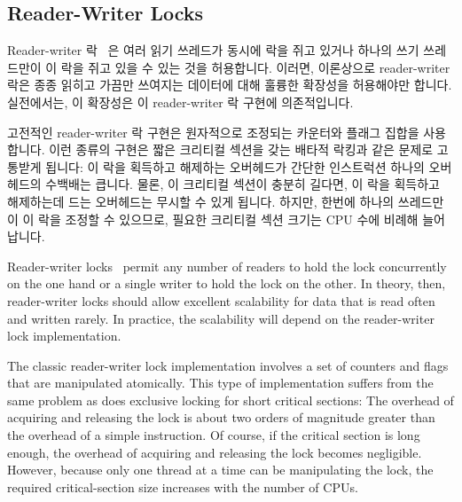 \subsection{Reader-Writer Locks}
\label{sec:locking:Reader-Writer Locks}

Reader-writer 락~\cite{Courtois71} 은 여러 읽기 쓰레드가 동시에 락을 쥐고
있거나 하나의 쓰기 쓰레드만이 이 락을 쥐고 있을 수 있는 것을 허용합니다.
이러면, 이론상으로 reader-writer 락은 종종 읽히고 가끔만 쓰여지는 데이터에 대해
훌륭한 확장성을 허용해야만 합니다.
실전에서는, 이 확장성은 이 reader-writer 락 구현에 의존적입니다.

고전적인 reader-writer 락 구현은 원자적으로 조정되는 카운터와 플래그 집합을
사용합니다.
이런 종류의 구현은 짧은 크리티컬 섹션을 갖는 배타적 락킹과 같은 문제로 고통받게
됩니다: 이 락을 획득하고 해제하는 오버헤드가 간단한 인스트럭션 하나의
오버헤드의 수백배는 큽니다.
물론, 이 크리티컬 섹션이 충분히 길다면, 이 락을 획득하고 해제하는데 드는
오버헤드는 무시할 수 있게 됩니다.
하지만, 한번에 하나의 쓰레드만이 이 락을 조정할 수 있으므로, 필요한 크리티컬
섹션 크기는 CPU 수에 비례해 늘어납니다.

\iffalse

Reader-writer locks~\cite{Courtois71}
permit any number of readers to hold the lock
concurrently on the one hand or a single writer to hold the lock
on the other.
In theory, then, reader-writer locks should allow excellent scalability
for data that is read often and written rarely.
In practice, the scalability will depend on the reader-writer lock
implementation.

The classic reader-writer lock implementation involves a set of
counters and flags that are manipulated atomically.
This type of implementation suffers from the same problem as does
exclusive locking for short critical sections: The overhead of acquiring
and releasing the lock
is about two orders of magnitude greater than the overhead
of a simple instruction.
Of course, if the critical section is long enough, the overhead of
acquiring and releasing the lock becomes negligible.
However, because only
one thread at a time can be manipulating the lock, the required
critical-section size increases with the number of CPUs.

